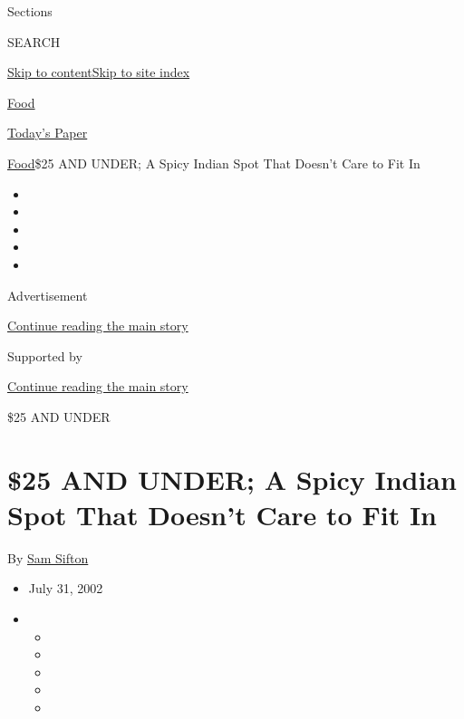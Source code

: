 Sections

SEARCH

\protect\hyperlink{site-content}{Skip to
content}\protect\hyperlink{site-index}{Skip to site index}

\href{https://www.nytimes3xbfgragh.onion/section/food}{Food}

\href{https://myaccount.nytimes3xbfgragh.onion/auth/login?response_type=cookie\&client_id=vi}{}

\href{https://www.nytimes3xbfgragh.onion/section/todayspaper}{Today's
Paper}

\href{/section/food}{Food}\textbar{}\$25 AND UNDER; A Spicy Indian Spot
That Doesn't Care to Fit In

\begin{itemize}
\item
\item
\item
\item
\item
\end{itemize}

Advertisement

\protect\hyperlink{after-top}{Continue reading the main story}

Supported by

\protect\hyperlink{after-sponsor}{Continue reading the main story}

\$25 AND UNDER

\hypertarget{25-and-under-a-spicy-indian-spot-that-doesnt-care-to-fit-in}{%
\section{\$25 AND UNDER; A Spicy Indian Spot That Doesn't Care to Fit
In}\label{25-and-under-a-spicy-indian-spot-that-doesnt-care-to-fit-in}}

By \href{https://www.nytimes3xbfgragh.onion/by/sam-sifton}{Sam Sifton}

\begin{itemize}
\item
  July 31, 2002
\item
  \begin{itemize}
  \item
  \item
  \item
  \item
  \item
  \end{itemize}
\end{itemize}

